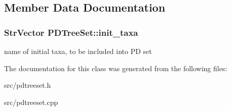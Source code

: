 \subsection{Member Data Documentation}
\hypertarget{classPDTreeSet_ae0a51247792a6dc0d1ac141c8beb2ad1}{
\subsubsection[{init\_\-taxa}]{\setlength{\rightskip}{0pt plus 5cm}StrVector {\bf PDTreeSet::init\_\-taxa}}}
\label{classPDTreeSet_ae0a51247792a6dc0d1ac141c8beb2ad1}
name of initial taxa, to be included into PD set 

The documentation for this class was generated from the following files:\begin{DoxyCompactItemize}
\item 
src/pdtreeset.h\item 
src/pdtreeset.cpp\end{DoxyCompactItemize}
